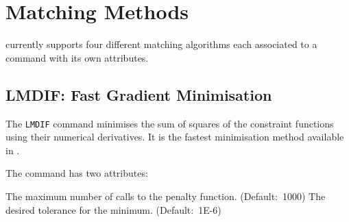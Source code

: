 \begin{table}[ht]
\begin{center}
\begin{tabular}{|lr|lr|lr|}
      \hline
    \end{tabular}
  \end{center}
\end{table}




%

\section{Matching Methods}
\label{sec:match_methods}

\madx currently supports four different matching algorithms each associated to 
a command with its own attributes. 

\subsection{LMDIF: Fast Gradient Minimisation}
\label{subsec:match_lmdif}
The {\tt LMDIF} command minimises the sum of squares of the constraint
functions using their numerical derivatives. It is the fastest
minimisation method available in \madx.
 

The command has two attributes:  
\begin{madlist}
    The maximum number of calls to the penalty
   function. (Default:~1000) 
    The desired tolerance for the minimum. 
   (Default:~1E-6)  
\end{madlist}

